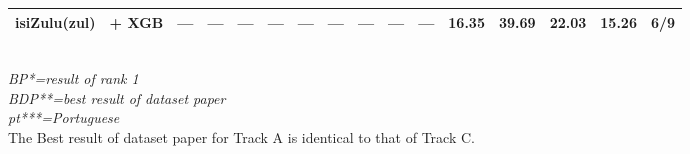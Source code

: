\begin{table*}[h]
{\begin{tabular}{l|c|cccc|ccccc|ccccc}
            isiZulu(zul)           & \citep{wang2024multilingual}     + XGB                                 & —                            & —                            & —                           & —             & —             & —            & —              & —             & —             & 16.35          & 39.69          & 22.03          & 15.26         & 6/9           \\
            \hline
        \end{tabular}
    }
    \\
    \footnotesize{\textit{BP*=result of rank 1\\BDP**=best result of dataset paper\citep{muhammad2025brighterbridginggaphumanannotated}\\pt***=Portuguese}}
    \\
    \footnotesize{The Best result of dataset paper for Track A is identical to that of Track C.}
\end{table*}